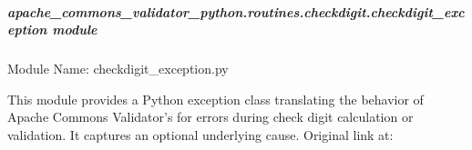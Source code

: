\documentclass[letterpaper,10pt,english]{sphinxmanual}
\begin{document}
\subparagraph{apache\_commons\_validator\_python.routines.checkdigit.checkdigit\_exception module}
\label{\detokenize{apache_commons_validator_python.routines.checkdigit:module-apache_commons_validator_python.routines.checkdigit.checkdigit_exception}}\label{\detokenize{apache_commons_validator_python.routines.checkdigit:apache-commons-validator-python-routines-checkdigit-checkdigit-exception-module}}
\sphinxAtStartPar
Module Name: checkdigit\_exception.py
\begin{description}
\sphinxAtStartPar
This module provides a Python exception class translating the behavior of
Apache Commons Validator’s  for errors during check
digit calculation or validation. It captures an optional underlying cause.
Original link at:
\begin{quote}

\sphinxAtStartPar
{}
\end{quote}

\end{description}
\end{document}
